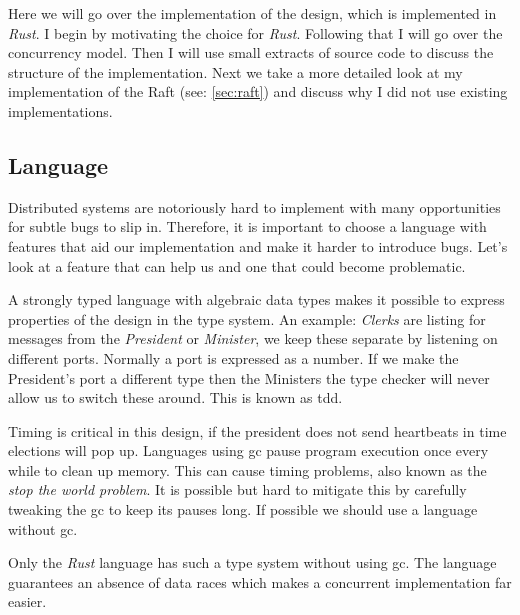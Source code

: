 Here we will go over the implementation of the design, which is implemented in \textit{Rust}. I begin by motivating the choice for \textit{Rust}. Following that I will go over the concurrency model. Then I will use small extracts of source code to discuss the structure of the implementation. Next we take a more detailed look at my implementation of the Raft (see: \cref{sec:raft}) and discuss why I did not use existing implementations.

\subsection{Language}
Distributed systems are notoriously hard to implement with many opportunities for subtle bugs to slip in. Therefore, it is important to choose a language with features that aid our implementation and make it harder to introduce bugs. Let's look at a feature that can help us and one that could become problematic.

A strongly typed language with algebraic data types makes it possible to express properties of the design in the type system. An example: \textit{Clerks} are listing for messages from the \textit{President} or \textit{Minister}, we keep these separate by listening on different ports. Normally a port is expressed as a number. If we make the President's port a different type then the Ministers the type checker will never allow us to switch these around. This is known as \ac{tdd}.

Timing is critical in this design, if the president does not send heartbeats in time elections will pop up. Languages using \ac{gc} pause program execution once every while to clean up memory. This can cause timing problems, also known as the \textit{stop the world problem}. It is possible but hard to mitigate this by carefully tweaking the \ac{gc} to keep its pauses long. If possible we should use a language without \ac{gc}.

Only the \textit{Rust} language has such a type system without using \ac{gc}. The language guarantees an absence of data races which makes a concurrent implementation far easier.

